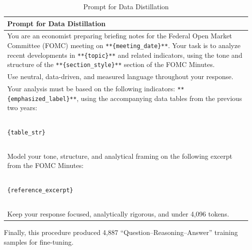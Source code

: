 \begin{table}[htbp]
    \centering
    \footnotesize
    \begin{tabular}{p{}}
    \toprule
    \textbf{Prompt for Data Distillation} \\
    \midrule
You are an economist preparing briefing notes for the Federal Open Market Committee (FOMC) meeting on \texttt{**\{meeting\_date\}**}.  
Your task is to analyze recent developments in \texttt{**\{topic\}**} and related indicators, using the tone and structure of the \texttt{**\{section\_style\}**} section of the FOMC Minutes. \\

Use neutral, data-driven, and measured language throughout your response. \\

Your analysis must be based on the following indicators: \texttt{**\{emphasized\_label\}**}, using the accompanying data tables from the previous two years: \\

~\\
\texttt{\{table\_str\}} \\
~\\


Model your tone, structure, and analytical framing on the following excerpt from the FOMC Minutes:\\

~\\
\texttt{\{reference\_excerpt\}} \\
~\\

Keep your response focused, analytically rigorous, and under 4,096 tokens. \\
    \bottomrule
    \end{tabular}
    \caption{Prompt for Data Distillation}
    \label{tab:ch2:prompt_for_data_distillation}
\end{table}

Finally, this procedure produced 4,887 ``Question--Reasoning--Answer'' training samples for fine-tuning.





